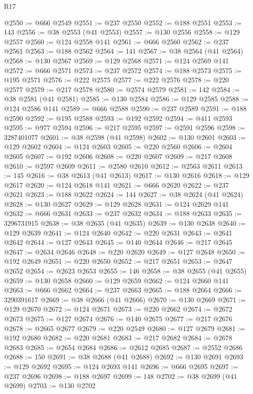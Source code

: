 \begin{lexlean}{R17}
\begin{coremodule}
@2550 := @666 @2549
@2551 := @237 @2550
@2552 := @188 @2551
@2553 := 143
@2556 := @38 @2553 (@41 @2553)
@2557 := @130 @2556
@2558 := @129 @2557
@2560 := @124 @2558 @141
@2561 := @666 @2560
@2562 := @237 @2561
@2563 := @188 @2562
@2564 := 141
@2567 := @38 @2564 (@41 @2564)
@2568 := @130 @2567
@2569 := @129 @2568
@2571 := @124 @2569 @141
@2572 := @666 @2571
@2573 := @237 @2572
@2574 := @188 @2573
@2575 := @195 @2571
@2576 := @222 @2575
@2577 := @222 @2576
@2578 := @220 @2577
@2579 := @217 @2578
@2580 := @2574 @2579
@2581 := 142
@2584 := @38 @2581 (@41 @2581)
@2585 := @130 @2584
@2586 := @129 @2585
@2588 := @124 @2586 @141
@2589 := @666 @2588
@2590 := @237 @2589
@2591 := @188 @2590
@2592 := @195 @2588
@2593 := @192 @2592
@2594 := @411 @2593
@2595 := @977 @2594
@2596 := @217 @2595
@2597 := @2591 @2596
@2598 := 3287401077
@2601 := @38 @2598 (@41 @2598)
@2602 := @130 @2601
@2603 := @129 @2602
@2604 := @124 @2603
@2605 := @220 @2560
@2606 := @2604 @2605
@2607 := @192 @2606
@2608 := @220 @2607
@2609 := @217 @2608
@2610 := @2597 @2609
@2611 := @2580 @2610
@2612 := @2563 @2611
@2613 := 145
@2616 := @38 @2613 (@41 @2613)
@2617 := @130 @2616
@2618 := @129 @2617
@2620 := @124 @2618 @141
@2621 := @666 @2620
@2622 := @237 @2621
@2623 := @188 @2622
@2624 := 144
@2627 := @38 @2624 (@41 @2624)
@2628 := @130 @2627
@2629 := @129 @2628
@2631 := @124 @2629 @141
@2632 := @666 @2631
@2633 := @237 @2632
@2634 := @188 @2633
@2635 := 3296731915
@2638 := @38 @2635 (@41 @2635)
@2639 := @130 @2638
@2640 := @129 @2639
@2641 := @124 @2640
@2642 := @220 @2631
@2643 := @2641 @2642
@2644 := @127 @2643
@2645 := @140 @2644
@2646 := @217 @2645
@2647 := @2634 @2646
@2648 := @220 @2620
@2649 := @127 @2648
@2650 := @192 @2649
@2651 := @220 @2650
@2652 := @217 @2651
@2653 := @2647 @2652
@2654 := @2623 @2653
@2655 := 146
@2658 := @38 @2655 (@41 @2655)
@2659 := @130 @2658
@2660 := @129 @2659
@2662 := @124 @2660 @141
@2663 := @666 @2662
@2664 := @237 @2663
@2665 := @188 @2664
@2666 := 3290391617
@2669 := @38 @2666 (@41 @2666)
@2670 := @130 @2669
@2671 := @129 @2670
@2672 := @124 @2671
@2673 := @220 @2662
@2674 := @2672 @2673
@2675 := @127 @2674
@2676 := @140 @2675
@2677 := @217 @2676
@2678 := @2665 @2677
@2679 := @220 @2549
@2680 := @127 @2679
@2681 := @192 @2680
@2682 := @220 @2681
@2683 := @217 @2682
@2684 := @2678 @2683
@2685 := @2654 @2684
@2686 := @2612 @2685
@2687 := @2552 @2686
@2688 := 150
@2691 := @38 @2688 (@41 @2688)
@2692 := @130 @2691
@2693 := @129 @2692
@2695 := @124 @2693 @141
@2696 := @666 @2695
@2697 := @237 @2696
@2698 := @188 @2697
@2699 := 148
@2702 := @38 @2699 (@41 @2699)
@2703 := @130 @2702

\end{coremodule}
\end{lexlean}
